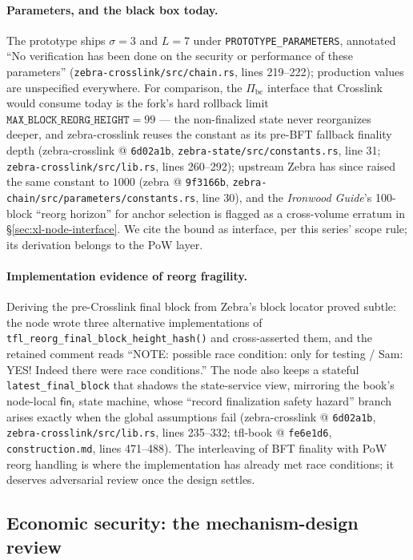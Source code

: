 \documentclass[11pt,a4paper]{article}
\theoremstyle{definition}
\begin{document}
\paragraph{Parameters, and the black box today.} The prototype ships
$\sigma = 3$ and $L = 7$ under
\texttt{PROTOTYPE\_PARAMETERS}, annotated ``No verification has been done
on the security or performance of these parameters''
(\texttt{zebra-crosslink/src/chain.rs}, lines 219--222); production values
are unspecified everywhere. For comparison, the $\Pi_{\mathrm{bc}}$
interface that Crosslink would consume today is the fork's hard rollback
limit $\texttt{MAX\_BLOCK\_REORG\_HEIGHT} = 99$ --- the non-finalized
state never reorganizes deeper, and zebra-crosslink reuses the constant
as its pre-BFT fallback finality depth (zebra-crosslink @
\texttt{6d02a1b}, \texttt{zebra-state/src/constants.rs}, line 31;
\texttt{zebra-crosslink/src/lib.rs}, lines 260--292); upstream Zebra has
since raised the same constant to $1000$ (zebra @ \texttt{9f3166b},
\texttt{zebra-chain/src/parameters/constants.rs}, line 30), and the
\emph{Ironwood Guide}'s 100-block ``reorg horizon'' for anchor selection
is flagged as a cross-volume erratum in \S\ref{sec:xl-node-interface}.
We cite the bound as interface, per this series' scope rule; its
derivation belongs to the PoW layer.

\paragraph{Implementation evidence of reorg fragility.} Deriving the
pre-Crosslink final block from Zebra's block locator proved subtle: the
node wrote three alternative implementations of
\texttt{tfl\_reorg\_final\_}\allowbreak\texttt{block\_height\_hash()} and
cross-asserted them, and the retained comment reads ``NOTE: possible race
condition: only for testing / Sam: YES! Indeed there were race
conditions.'' The node also keeps a stateful
\texttt{latest\_final\_block} that shadows the state-service view,
mirroring the book's node-local $\mathsf{fin}_i$ state machine, whose
``record finalization safety hazard'' branch arises exactly when the
global assumptions fail (zebra-crosslink @ \texttt{6d02a1b},
\texttt{zebra-crosslink/src/lib.rs}, lines 235--332; tfl-book @
\texttt{fe6e1d6}, \texttt{construction.md}, lines 471--488). The
interleaving of BFT finality with PoW reorg handling is where the
implementation has already met race conditions; it deserves adversarial
review once the design settles.

\subsection{Economic security: the mechanism-design review}
\label{sec:xl-econ}
\end{document}
